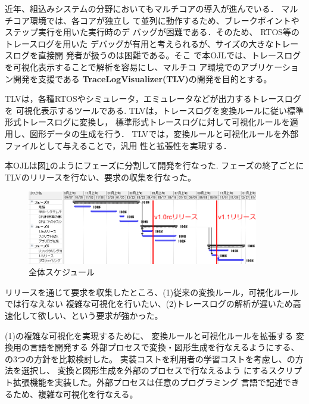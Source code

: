 \documentclass[a4paper,12pt]{jarticle}
\begin{document}
{
\setlength{\baselineskip}{0.9\normalbaselineskip}

近年、組込みシステムの分野においてもマルチコアの導入が進んでいる．
マルチコア環境では、各コアが独立し
て並列に動作するため、ブレークポイントやステップ実行を用いた実行時のデ
バッグが困難である．そのため、 RTOS等のトレースログを用いた
デバッグが有用と考えられるが、サイズの大きなトレースログを直接開
発者が扱うのは困難である。そこ
で本OJLでは、トレースログを可視化表示することで解析を容易にし、マルチコ
ア環境でのアプリケーション開発を支援である
\textbf{TraceLogVisualizer(TLV)}の開発を目的とする。

TLVは，各種RTOSやシミュレータ，エミュレータなどが出力するトレースログを
可視化表示するツールである. TLVは，トレースログを変換ルールに従い標準形式トレースログに変換し，
標準形式トレースログに対して可視化ルールを適用し、図形データの生成を行う．
TLVでは，変換ルールと可視化ルールを外部ファイルとして与えることで，汎用
性と拡張性を実現する．

本OJLは図\ref{schedule}のようにフェーズに分割して開発を行なった.
フェーズの終了ごとにTLVのリリースを行ない、要求の収集を行なった。


\begin{figure}[b]
\centering
\vspace{1zh}
\includegraphics[width=0.9\textwidth]{whole_schedule.png}
\caption{全体スケジュール}\label{schedule}
\end{figure}

リリースを通じて要求を収集したところ、(1)従来の変換ルール，可視化ルールでは行なえない
複雑な可視化を行いたい、(2)トレースログの解析が遅いため高速化して欲しい、という要求が強かった。

(1)の複雑な可視化を実現するために、
変換ルールと可視化ルールを拡張する
変換用の言語を開発する
外部プロセスで変換・図形生成を行なえるようにする、
の3つの方針を比較検討した。
実装コストを利用者の学習コストを考慮し、の方法を選択し、
変換と図形生成を外部のプロセスで行なえるよう
にするスクリプト拡張機能を実装した。外部プロセスは任意のプログラミング
言語で記述できるため、複雑な可視化を行なえる。

}
\end{document}
